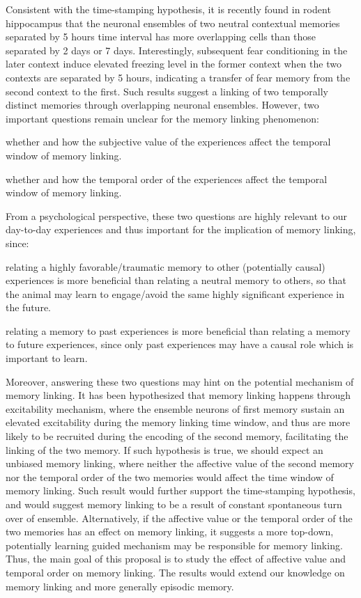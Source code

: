 \documentclass[master.tex]{subfiles}
\begin{document}
Consistent with the time-stamping hypothesis, it is recently found in rodent
hippocampus that the neuronal ensembles of two neutral contextual memories
separated by 5 hours time interval has more overlapping cells than those
separated by 2 days or 7 days. Interestingly, subsequent fear conditioning in
the later context induce elevated freezing level in the former context when the
two contexts are separated by 5 hours, indicating a transfer of fear memory from
the second context to the first. Such results suggest a linking of two
temporally distinct memories through overlapping neuronal ensembles. However,
two important questions remain unclear for the memory linking phenomenon:
\begin{inparaenum}[a)] \bfseries
\item whether and how the subjective value of the experiences affect the
  temporal window of memory linking.
\item whether and how the temporal order of the experiences affect the temporal
  window of memory linking.
\end{inparaenum}
From a psychological perspective, these two questions are highly relevant to our
day-to-day experiences and thus important for the implication of memory linking,
since:
\begin{inparaenum}[a)]
\item relating a highly favorable/traumatic memory to other (potentially causal)
  experiences is more beneficial than relating a neutral memory to others, so
  that the animal may learn to engage/avoid the same highly significant
  experience in the future.
\item relating a memory to past experiences is more beneficial than relating a
  memory to future experiences, since only past experiences may have a causal
  role which is important to learn.
\end{inparaenum}
Moreover, answering these two questions may hint on the potential mechanism of
memory linking. It has been hypothesized that memory linking happens through
excitability mechanism, where the ensemble neurons of first memory sustain an
elevated excitability during the memory linking time window, and thus are more
likely to be recruited during the encoding of the second memory, facilitating
the linking of the two memory. If such hypothesis is true, we should expect an
unbiased memory linking, where neither the affective value of the second memory
nor the temporal order of the two memories would affect the time window of
memory linking. Such result would further support the time-stamping hypothesis,
and would suggest memory linking to be a result of constant spontaneous turn
over of ensemble. Alternatively, if the affective value or the temporal order of
the two memories has an effect on memory linking, it suggests a more top-down,
potentially learning guided mechanism may be responsible for memory linking.
Thus, the main goal of this proposal is to study the effect of affective value
and temporal order on memory linking. The results would extend our knowledge on
memory linking and more generally episodic memory.
\end{document}
